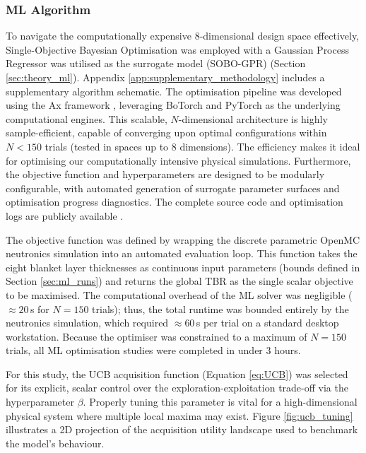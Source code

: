 \documentclass[11pt]{article}
\begin{document}
\subsubsection{ML Algorithm}
\label{sec:method_ml}
To navigate the computationally expensive 8-dimensional design space effectively, Single-Objective
Bayesian Optimisation was employed with a Gaussian Process Regressor  
was utilised as the surrogate model (SOBO-GPR) (Section \ref{sec:theory_ml}). Appendix 
\ref{app:supplementary_methodology} includes a supplementary algorithm schematic.
The optimisation pipeline was developed using the Ax framework \citep{olson2025ax}, 
leveraging BoTorch \citep{Balandatetal2019} and PyTorch
\citep{Paszkeetal2019} as the underlying computational engines. This scalable, $N$-dimensional
architecture is highly sample-efficient, capable of converging upon optimal configurations within
$N<150$ trials (tested in spaces up to 8 dimensions). The efficiency makes it ideal for optimising
our computationally intensive physical simulations. Furthermore, the objective function and
hyperparameters are designed to be modularly configurable, with automated generation of surrogate
parameter surfaces and optimisation progress diagnostics. The complete source code and optimisation
logs are publicly available \citep{khan2026fusionmlcode}.

The objective function was defined by wrapping the discrete parametric OpenMC neutronics simulation
into an automated evaluation loop. This function takes the eight blanket layer thicknesses as
continuous input parameters (bounds defined in Section \ref{sec:ml_runs}) and returns the global TBR
as the single scalar objective to be maximised. The computational overhead of the ML solver was
negligible ($\approx20$\,s for $N=150$ trials); thus, the total runtime was bounded entirely by the
neutronics simulation, which required $\approx60$\,s per trial on a standard desktop workstation.
Because the optimiser was constrained to a maximum of $N=150$ trials, all ML optimisation studies
were completed in under 3 hours.

For this study, the UCB acquisition function (Equation \ref{eq:UCB}) was selected for its explicit,
scalar control over the exploration-exploitation trade-off via the hyperparameter $\beta$. Properly
tuning this parameter is vital for a high-dimensional physical system where multiple local maxima
may exist. Figure \ref{fig:ucb_tuning} illustrates a 2D projection of the acquisition utility
landscape used to benchmark the model's behaviour.
\end{document}
